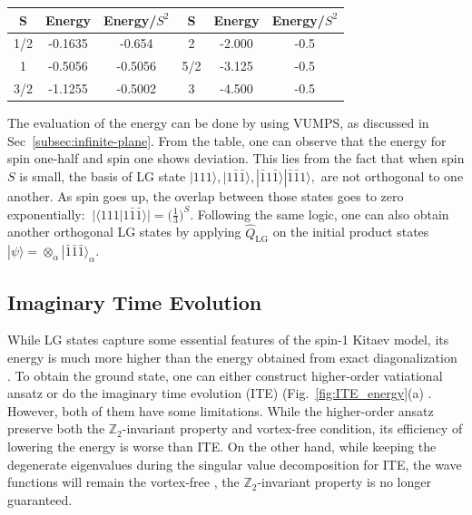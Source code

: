 \documentclass{ntuthesis}
\newcommand{\citep}{\cite}
\begin{document}
\begin{center}
 \begin{tabular}{||c |c| c|| c |c| c||} 
 \hline
S & Energy & Energy/$S^2$ & S & Energy & Energy/$S^2$   \\ 
 \hline
 1/2 & -0.1635 & -0.654 & 2 & -2.000 & -0.5 \\ 
\hline
 1 & -0.5056 & -0.5056 & 5/2 & -3.125 & -0.5 \\ 
 \hline
 3/2 & -1.1255 & -0.5002 & 3 & -4.500 & -0.5 \\ 
 \hline
\end{tabular}
\end{center}

The evaluation of the energy can be done by using VUMPS, as discussed in Sec~\ref{subsec:infinite-plane}. From the table, one can observe that the energy for spin one-half and spin one shows deviation. This lies from the fact that when spin $S$ is small, the basis of LG state $|111\rangle , |1\bar{1}\bar{1}\rangle ,|\bar{1}1\bar{1}\rangle  |\bar{1}\bar{1}1\rangle ,$  are not orthogonal to one another. As spin goes up, the overlap between those states goes to zero exponentially: ${\ |\langle 111|1\bar{1}\bar{1}\rangle| =  \big (\frac{1}{3} \big)^{S} }$. Following the same logic, one can also obtain another orthogonal LG states by applying $\hat{Q}_{\text{LG}}$ on the initial product states $|\psi \rangle = \otimes_\alpha |\bar{1}\bar{1}\bar{1}\rangle_\alpha$.

\subsection{Imaginary Time Evolution}
While LG states capture some essential features of the spin-1 Kitaev model, its energy is much more higher than the energy obtained from exact diagonalization \citep{2018_exact_spin1}. To obtain the ground state, one can either construct higher-order vatiational ansatz or do the imaginary time evolution (ITE) (Fig.~\ref{fig:ITE_energy}(a) \cite{simple-update}. However, both of them have some limitations. While the higher-order ansatz preserve both the $\mathbb{Z}_2$-invariant property and vortex-free condition, its efficiency of lowering the energy is worse than ITE. 
%
On the other hand, while keeping the degenerate eigenvalues during the singular value decomposition for ITE, the wave functions will remain the vortex-free \citep{2020-spin-one-kitaev}, the $\mathbb{Z}_2$-invariant property is no longer guaranteed.
\end{document}
